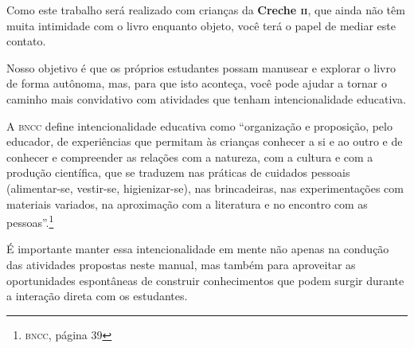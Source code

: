 \documentclass[11pt]{extarticle}
\begin{document}

Como este trabalho será realizado com crianças da \textbf{Creche \textsc{ii}}, 
que ainda não têm muita intimidade com o livro enquanto objeto, você terá o 
papel de mediar este contato. 

Nosso objetivo é que os próprios estudantes possam manusear 
e explorar o livro de forma autônoma, mas, para que isto aconteça, você 
pode ajudar a tornar o caminho mais convidativo com atividades que tenham 
intencionalidade educativa. 

A \textsc{bncc} define intencionalidade educativa como ``organização 
e proposição, pelo educador, de experiências que permitam às crianças 
conhecer a si e ao outro e de conhecer e compreender as relações com a 
natureza, com a cultura e com a produção científica, que se traduzem nas 
práticas de cuidados pessoais (alimentar-se, vestir-se, higienizar-se), 
nas brincadeiras, nas experimentações com materiais 
variados, na aproximação com a literatura e no encontro com as 
pessoas''.\footnote{\textsc{bncc}, página 39}

É importante manter essa intencionalidade em mente não apenas na condução 
das atividades propostas neste manual, mas também para aproveitar as 
oportunidades espontâneas de construir conhecimentos que podem surgir durante 
a interação direta com os estudantes.
\end{document}
